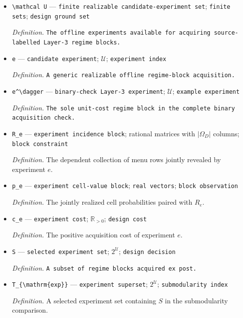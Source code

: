 \documentclass{article}
\begin{document}
\begin{itemize}
  \item \texttt{\textbackslash{}\allowbreak{}mathcal U} --- \texttt{finite realizable candidate-\allowbreak{}experiment set}; \texttt{finite sets}; \texttt{design ground set}
  \par\smallskip\noindent\emph{Definition.} \texttt{The offline experiments available for acquiring source-\allowbreak{}labelled Layer-\allowbreak{}3 regime blocks.}
  \item \texttt{e} --- \texttt{candidate experiment}; \(\mathcal U\); \texttt{experiment index}
  \par\smallskip\noindent\emph{Definition.} \texttt{A generic realizable offline regime-\allowbreak{}block acquisition.}
  \item \texttt{e\textasciicircum{}\textbackslash{}\allowbreak{}dagger} --- \texttt{binary-\allowbreak{}check Layer-\allowbreak{}3 experiment}; \(\mathcal U\); \texttt{example experiment}
  \par\smallskip\noindent\emph{Definition.} \texttt{The sole unit-\allowbreak{}cost regime block in the complete binary acquisition check.}
  \item \texttt{R\_\allowbreak{}e} --- \texttt{experiment incidence block}; rational matrices with \(\lvert\Omega_D\rvert\) columns; \texttt{block constraint}
  \par\smallskip\noindent\emph{Definition.} The dependent collection of menu rows jointly revealed by experiment \(e\).
  \item \texttt{p\_\allowbreak{}e} --- \texttt{experiment cell-\allowbreak{}value block}; \texttt{real vectors}; \texttt{block observation}
  \par\smallskip\noindent\emph{Definition.} The jointly realized cell probabilities paired with \(R_e\).
  \item \texttt{c\_\allowbreak{}e} --- \texttt{experiment cost}; \(\mathbb R_{>0}\); \texttt{design cost}
  \par\smallskip\noindent\emph{Definition.} The positive acquisition cost of experiment \(e\).
  \item \texttt{S} --- \texttt{selected experiment set}; \(2^{\mathcal U}\); \texttt{design decision}
  \par\smallskip\noindent\emph{Definition.} \texttt{A subset of regime blocks acquired ex post.}
  \item \texttt{T\_\allowbreak{}\{\textbackslash{}\allowbreak{}mathrm\{exp\}\allowbreak{}\}\allowbreak{}} --- \texttt{experiment superset}; \(2^{\mathcal U}\); \texttt{submodularity index}
  \par\smallskip\noindent\emph{Definition.} A selected experiment set containing \(S\) in the submodularity comparison.

\end{itemize}
\end{document}
